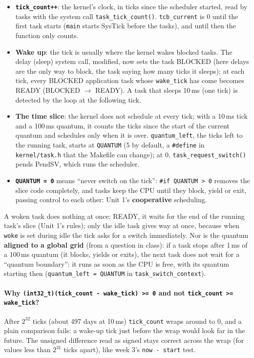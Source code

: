 \begin{itemize}
    \item \textbf{\texttt{tick\_count++}}: the kernel's clock, in ticks since the scheduler started, read by tasks with the system call \texttt{task\_tick\_count()}. \texttt{tcb\_current} is 0 until the first task starts (\texttt{main} starts SysTick before the tasks), and until then the function only counts.
    \item \textbf{Wake up}: the tick is usually where the kernel wakes blocked tasks. The delay (sleep) system call, modified, now sets the task BLOCKED (here delays are the only way to block, the task saying how many ticks it sleeps); at each tick, every BLOCKED application task whose \texttt{wake\_tick} has come becomes READY (BLOCKED $\to$ READY). A task that sleeps 10\,ms (one tick) is detected by the loop at the following tick.
    \item \textbf{The time slice}: the kernel does not schedule at every tick; with a 10\,ms tick and a 100\,ms quantum, it counts the ticks since the start of the current quantum and schedules only when it is over. \texttt{quantum\_left}, the ticks left to the running task, starts at \texttt{QUANTUM} (5 by default, a \texttt{\#define} in \texttt{kernel/task.h} that the Makefile can change); at 0, \texttt{task\_request\_switch()} pends PendSV, which runs the scheduler.
    \item \textbf{\texttt{QUANTUM = 0}} means ``never switch on the tick'': \texttt{\#if QUANTUM > 0} removes the slice code completely, and tasks keep the CPU until they block, yield or exit, passing control to each other: Unit 1's \textbf{cooperative} scheduling.
\end{itemize}
A woken task does nothing at once: READY, it waits for the end of the running task's slice (Unit 1's rules); only the idle task gives way at once, because when \texttt{woke} is set during idle the tick asks for a switch immediately. Nor is the quantum \textbf{aligned to a global grid} (from a question in class): if a task stops after 1\,ms of a 100\,ms quantum (it blocks, yields or exits), the next task does not wait for a ``quantum boundary'': it runs as soon as the CPU is free, with its quantum starting then (\texttt{quantum\_left = QUANTUM} in \texttt{task\_switch\_context}).

\paragraph{Why \texttt{(int32\_t)(tick\_count - wake\_tick) >= 0} and not \texttt{tick\_count >= wake\_tick}?} After $2^{32}$ ticks (about 497 days at 10\,ms) \texttt{tick\_count} wraps around to 0, and a plain comparison fails: a wake-up tick just before the wrap would look far in the future. The unsigned difference read as signed stays correct across the wrap (for values less than $2^{31}$ ticks apart), like week 3's \texttt{now - start} test.

